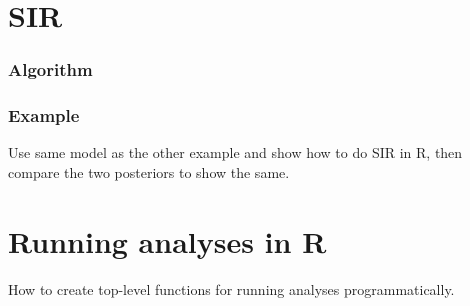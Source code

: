 \documentclass{article}\usepackage[]{graphicx}\usepackage[]{color}
\begin{document}
\section{SIR}\label{sec:sir}
\subsubsection{Algorithm}
\subsubsection{Example}
Use same model as the other example and show how to do SIR in R,
then compare the two posteriors to show the same.
\section{Running analyses in R}
How to create top-level functions for running analyses
programmatically.
\end{document}

